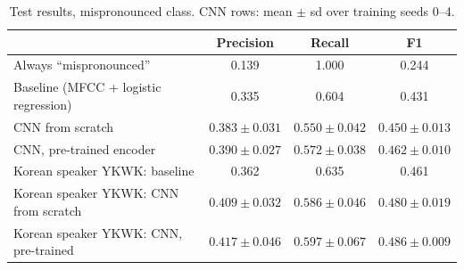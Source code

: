 \documentclass[final]{article}
\begin{document}
\begin{table}[!h]
  \centering
  \small
  \caption{Test results, mispronounced class. CNN rows: mean $\pm$ sd over training seeds 0--4.}
  \label{tab:results}
  \begin{tabular}{lccc}
    \toprule
    & Precision & Recall & F1 \\
    \midrule
    Always ``mispronounced'' & 0.139 & 1.000 & 0.244 \\
    Baseline (MFCC + logistic regression) & 0.335 & 0.604 & 0.431 \\
    CNN from scratch & $0.383 \pm 0.031$ & $0.550 \pm 0.042$ & $0.450 \pm 0.013$ \\
    CNN, pre-trained encoder & $0.390 \pm 0.027$ & $0.572 \pm 0.038$ & $\mathbf{0.462 \pm 0.010}$ \\
    \midrule
    Korean speaker YKWK: baseline & 0.362 & 0.635 & 0.461 \\
    Korean speaker YKWK: CNN from scratch & $0.409 \pm 0.032$ & $0.586 \pm 0.046$ & $0.480 \pm 0.019$ \\
    Korean speaker YKWK: CNN, pre-trained & $0.417 \pm 0.046$ & $0.597 \pm 0.067$ & $0.486 \pm 0.009$ \\
    \bottomrule
  \end{tabular}
\end{table}
\end{document}
